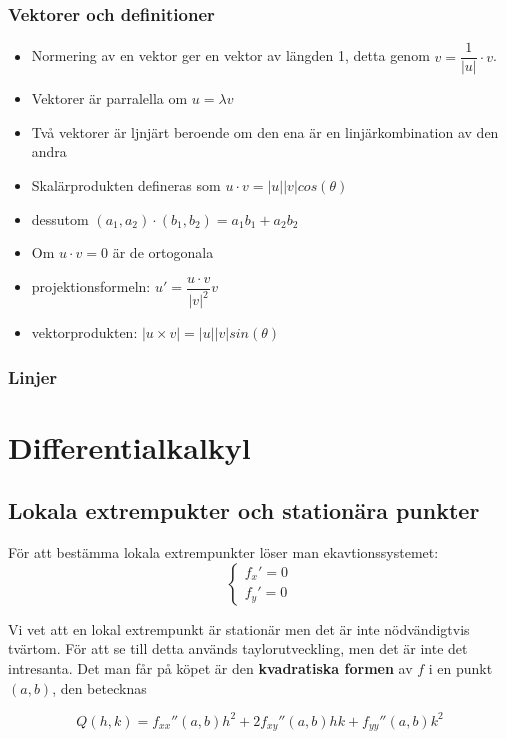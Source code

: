 \documentclass[12pt]{article} %
\begin{document}
\subsubsection{Vektorer och definitioner}
\begin{itemize}
    \item Normering av en vektor ger en vektor av längden 1, detta genom $v = \dfrac{1}{|u|} \cdot v$.
    \item Vektorer är parralella om $u = \lambda v$
    \item Två vektorer är ljnjärt beroende om den ena är en linjärkombination av den andra
    \item Skalärprodukten defineras som $u \cdot v = |u||v|cos(\theta)$
    \item dessutom $(a_{1}, a_{2}) \cdot (b_{1}, b_{2}) = a_{1}b_{1} + a_{2}b_{2}$
    \item Om $u \cdot v = 0$ är de ortogonala
    \item projektionsformeln: $u' = \dfrac{u \cdot v}{|v|^2}v$
    \item vektorprodukten: $|u \times v| = |u||v|sin(\theta)$
\end{itemize}

\subsubsection{Linjer}


\section{Differentialkalkyl} %

\subsection{Lokala extrempukter och stationära punkter} %

För att bestämma lokala extrempunkter löser man ekavtionssystemet:
\[
    \begin{cases}
        f_{x}' = 0 \\
        f_{y}' = 0
    \end{cases}
\]

Vi vet att en lokal extrempunkt är stationär men det är inte nödvändigtvis tvärtom. För att se till detta används taylorutveckling, men det är inte det intresanta. Det man får på köpet är den \textbf{kvadratiska formen} av $f$ i en punkt $(a,b)$, den betecknas

\[
    Q(h,k) = f_{xx}'' (a,b) h^2 + 2 f_{xy}''(a,b) hk + f_{yy}'' (a,b) k^2
\]
\end{document}
